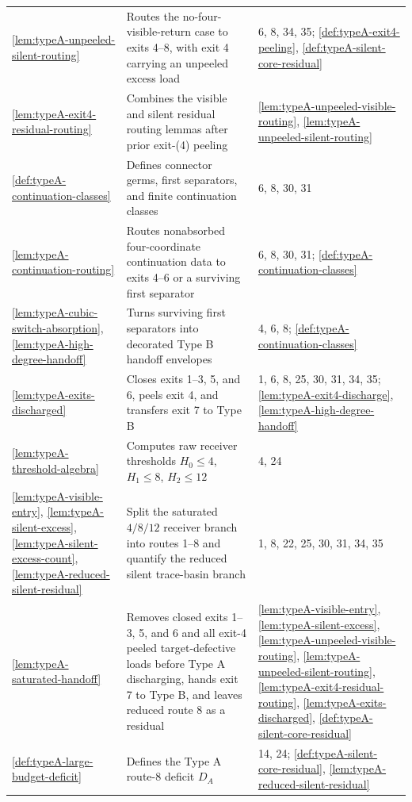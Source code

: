 \documentclass[11pt]{article}
\begin{document}
{\begin{longtable}{L{0.31\textwidth} L{0.42\textwidth} L{0.17\textwidth}}
\cref{lem:typeA-unpeeled-silent-routing} & Routes the no-four-visible-return case to exits 4--8, with exit 4 carrying an unpeeled excess load & 6, 8, 34, 35; \cref{def:typeA-exit4-peeling}, \cref{def:typeA-silent-core-residual} \\
\cref{lem:typeA-exit4-residual-routing} & Combines the visible and silent residual routing lemmas after prior exit-(4) peeling & \cref{lem:typeA-unpeeled-visible-routing}, \cref{lem:typeA-unpeeled-silent-routing} \\
\cref{def:typeA-continuation-classes} & Defines connector germs, first separators, and finite continuation classes & 6, 8, 30, 31 \\
\cref{lem:typeA-continuation-routing} & Routes nonabsorbed four-coordinate continuation data to exits 4--6 or a surviving first separator & 6, 8, 30, 31; \cref{def:typeA-continuation-classes} \\
\cref{lem:typeA-cubic-switch-absorption}, \cref{lem:typeA-high-degree-handoff} & Turns surviving first separators into decorated Type B handoff envelopes & 4, 6, 8; \cref{def:typeA-continuation-classes} \\
\cref{lem:typeA-exits-discharged} & Closes exits 1--3, 5, and 6, peels exit 4, and transfers exit 7 to Type B & 1, 6, 8, 25, 30, 31, 34, 35; \cref{lem:typeA-exit4-discharge}, \cref{lem:typeA-high-degree-handoff} \\
\cref{lem:typeA-threshold-algebra} & Computes raw receiver thresholds $H_0\le4$, $H_1\le8$, $H_2\le12$ & 4, 24 \\
\cref{lem:typeA-visible-entry}, \cref{lem:typeA-silent-excess}, \cref{lem:typeA-silent-excess-count}, \cref{lem:typeA-reduced-silent-residual} & Split the saturated $4/8/12$ receiver branch into routes 1--8 and quantify the reduced silent trace-basin branch & 1, 8, 22, 25, 30, 31, 34, 35 \\
\cref{lem:typeA-saturated-handoff} & Removes closed exits 1--3, 5, and 6 and all exit-4 peeled target-defective loads before Type A discharging, hands exit 7 to Type B, and leaves reduced route 8 as a residual & \cref{lem:typeA-visible-entry}, \cref{lem:typeA-silent-excess}, \cref{lem:typeA-unpeeled-visible-routing}, \cref{lem:typeA-unpeeled-silent-routing}, \cref{lem:typeA-exit4-residual-routing}, \cref{lem:typeA-exits-discharged}, \cref{def:typeA-silent-core-residual} \\
\cref{def:typeA-large-budget-deficit} & Defines the Type A route-8 deficit \(D_A\) & 14, 24; \cref{def:typeA-silent-core-residual}, \cref{lem:typeA-reduced-silent-residual} \\

\end{longtable}}
\end{document}
